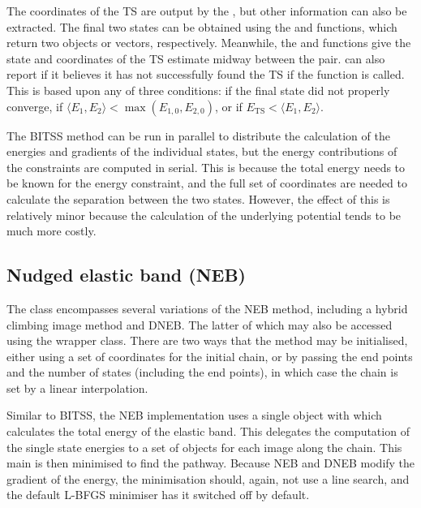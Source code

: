 The coordinates of the TS are output by the , but other information can also be extracted.
The final two states can be obtained using the  and  functions, which return two  objects or vectors, respectively.
Meanwhile, the  and  functions give the state and coordinates of the TS estimate midway between the pair.
 can also report if it believes it has not successfully found the TS if the  function is called.
This is based upon any of three conditions: if the final state did not properly converge, if $\langle E_1, E_2 \rangle < \max(E_{1,0}, E_{2,0})$, or if $E_\text{TS} < \langle E_1, E_2 \rangle$.

The BITSS method can be run in parallel to distribute the calculation of the energies and gradients of the individual states, but the energy contributions of the constraints are computed in serial.
This is because the total energy needs to be known for the energy constraint, and the full set of coordinates are needed to calculate the separation between the two states.
However, the effect of this is relatively minor because the calculation of the underlying potential tends to be much more costly.


\subsection{Nudged elastic band (NEB)}
The  class encompasses several variations of the NEB method, including a hybrid climbing image method and DNEB.
The latter of which may also be accessed using the  wrapper class.
There are two ways that the method may be initialised, either using a set of coordinates for the initial chain, or by passing the end points and the number of states (including the end points), in which case the chain is set by a linear interpolation.

Similar to BITSS, the NEB implementation uses a single  object with  which calculates the total energy of the elastic band.
This delegates the computation of the single state energies to a set of  objects for each image along the chain.
This main  is then minimised to find the pathway.
Because NEB and DNEB modify the gradient of the energy, the minimisation should, again, not use a line search, and the default L-BFGS minimiser has it switched off by default.

